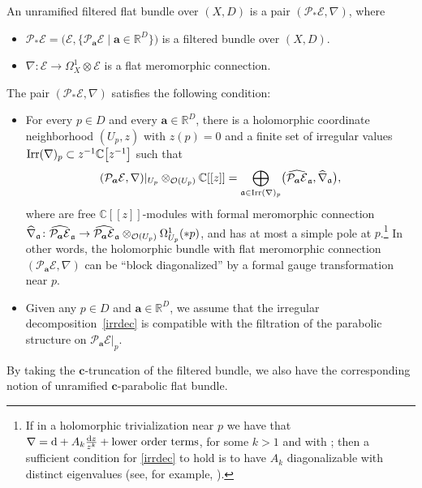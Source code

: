 \begin{Definition} An unramified filtered flat bundle over $(X,D)$ is a pair $(\mathcal{P}_*\mathcal{E},\nabla)$, where
\begin{itemize}\itemsep=0pt
 \item $\mathcal{P}_*\mathcal{E}=\bigl(\mathcal{E},\bigl\{\mathcal{P}_{\boldsymbol{a}}\mathcal{E} \mid \boldsymbol{a} \in \mathbb{R}^{D}\bigr\}\bigr)$ is a filtered bundle over $(X,D)$.
 \item $\nabla\colon\mathcal{E}\to \Omega^1_X\otimes \mathcal{E}$ is a flat meromorphic connection.
\end{itemize}
The pair $(\mathcal{P}_*\mathcal{E},\nabla)$ satisfies the following condition:
\begin{itemize}\itemsep=0pt
 \item For every $p\in D$ and every $\boldsymbol{a}\in \mathbb{R}^{D}$, there is a holomorphic coordinate neighborhood $(U_p,z)$ with $z(p)=0$ and a finite set of irregular values $\textnormal{Irr}(\nabla)_p\subset z^{-1}\mathbb{C}\bigl[z^{-1}\bigr]$ such that
 \begin{equation}\label{irrdec}
 (\mathcal{P}_{\boldsymbol{a}}\mathcal{E},\nabla)|_{U_p}\otimes_{\mathcal{O}(U_p)}\mathbb{C}[[z]]=\bigoplus_{\mathfrak{a}\in \textnormal{Irr}(\nabla)_p}\bigl(\widehat{\mathcal{P}_{\boldsymbol{a}}\mathcal{E}}_{\mathfrak{a}},\widehat{\nabla}_{\mathfrak{a}}\bigr),
\end{equation}
where  are free $\mathbb{C}[[z]]$-modules with formal meromorphic connection $\smash{\widehat{\nabla}_{\mathfrak{a}}\colon \widehat{\mathcal{P}_{\boldsymbol{a}}\mathcal{E}}_{\mathfrak{a}}}\to \smash{\widehat{\mathcal{P}_{\boldsymbol{a}}\mathcal{E}}_{\mathfrak{a}} \otimes _{\mathcal{O}(U_p)} \Omega^1_{U_p}(* p)}$, and  has at most a simple pole at $p$.\footnote{If in a holomorphic trivialization near $p$ we have that $\nabla={\rm d} +A_k\frac{{\rm d}z}{z^k} + \text{lower order terms}$, for some $k>1$ and with ; then a sufficient condition for \eqref{irrdec} to hold is to have $A_k$ diagonalizable with distinct eigenvalues (see, for example, \cite[Lemma 1]{B2}).} In other words, the holomorphic bundle with flat meromorphic connection $(\mathcal{P}_{\boldsymbol{a}}\mathcal{E},\nabla)$ can be ``block diagonalized'' by a formal gauge transformation near $p$.
\item Given any $p\in D$ and $\boldsymbol{a}\in \mathbb{R}^D$, we assume that the irregular decomposition~\eqref{irrdec} is compatible with the filtration of the parabolic structure on $\mathcal{P}_{\boldsymbol{a}}\mathcal{E}|_p$.
\end{itemize}

By taking the $\boldsymbol{c}$-truncation of the filtered bundle, we also have the corresponding notion of unramified $\boldsymbol{c}$-parabolic flat bundle.
\end{Definition}

